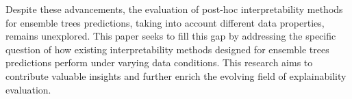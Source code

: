 Despite these advancements, the evaluation of post-hoc interpretability methods for ensemble trees predictions, taking into account different data properties, remains unexplored. This paper seeks to fill this gap by addressing the specific question of how existing interpretability methods designed for ensemble trees predictions perform under varying data conditions. This research aims to contribute valuable insights and further enrich the evolving field of explainability evaluation.
